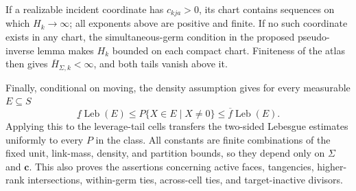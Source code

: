 If a realizable incident coordinate has \(c_{kja}>0\), its chart contains sequences on which \(H_k\to\infty\); all exponents above are positive and finite. If no such coordinate exists in any chart, the simultaneous-germ condition in the proposed pseudo-inverse lemma makes \(H_k\) bounded on each compact chart. Finiteness of the atlas then gives \(\overline H_{\Sigma,k}<\infty\), and both tails vanish above it.

Finally, conditional on moving, the density assumption gives for every measurable \(E\subseteq S\)
\[
\underline f\operatorname{Leb}(E)\le P\{X\in E\mid X\ne0\}
\le\overline f\operatorname{Leb}(E).
\]
Applying this to the leverage-tail cells transfers the two-sided Lebesgue estimates uniformly to every \(P\) in the class. All constants are finite combinations of the fixed unit, link-mass, density, and partition bounds, so they depend only on \(\Sigma\) and \(\mathbf c\). This also proves the assertions concerning active faces, tangencies, higher-rank intersections, within-germ ties, across-cell ties, and target-inactive divisors.